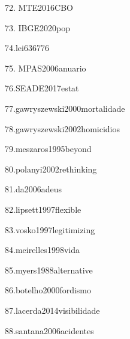 72. MTE2016CBO

73. IBGE2020pop

74.lei636776

75. MPAS2006anuario

76.SEADE2017estat

77.gawryszewski2000mortalidade

78.gawryszewski2002homicidios

79.meszaros1995beyond

80.polanyi2002rethinking

81.da2006adeus

82.lipsett1997flexible

83.vosko1997legitimizing

84.meirelles1998vida

85.myers1988alternative

86.botelho2000fordismo

87.lacerda2014visibilidade


88.santana2006acidentes

